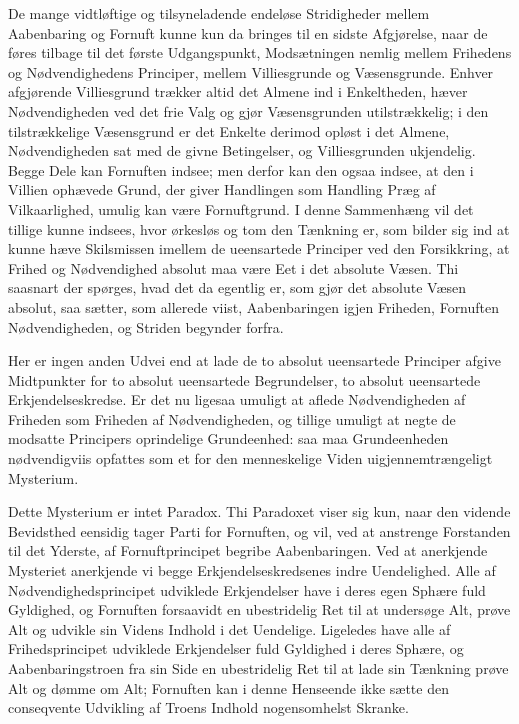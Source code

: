 \documentclass[12pt]{book}
\begin{document}
De mange vidtløftige og tilsyneladende endeløse Stridigheder mellem
Aabenbaring og Fornuft kunne kun da bringes til en sidste
Afgjørelse, naar de føres tilbage til det første Udgangspunkt,
Modsætningen nemlig mellem Frihedens og Nødvendighedens Principer,
mellem Villiesgrunde og Væsensgrunde. Enhver afgjørende Villiesgrund
trækker altid det Almene ind i Enkeltheden, hæver Nødvendigheden ved
det frie Valg og gjør Væsensgrunden utilstrækkelig; i den
tilstrækkelige Væsensgrund er det Enkelte derimod opløst i det
Almene, Nødvendigheden sat med de givne Betingelser, og
Villiesgrunden ukjendelig. Begge Dele kan Fornuften indsee; men
derfor kan den ogsaa indsee, at den i Villien ophævede Grund, der
giver Handlingen som Handling Præg af Vilkaarlighed, umulig kan være
Fornuftgrund. I denne Sammenhæng vil det tillige kunne indsees, hvor
ørkesløs og tom den Tænkning er, som bilder sig ind at kunne hæve
Skilsmissen imellem de ueensartede Principer ved den Forsikkring, at
Frihed og Nødvendighed absolut maa være Eet i det absolute Væsen.
Thi saasnart der spørges, hvad det da egentlig er, som gjør det
absolute Væsen absolut, saa
sætter, som allerede viist, Aabenbaringen igjen Friheden, Fornuften
Nødvendigheden, og Striden begynder forfra.

Her er ingen anden Udvei end at lade de to absolut ueensartede
Principer afgive Midtpunkter for to absolut ueensartede
Begrundelser, to absolut ueensartede Erkjendelseskredse. Er det nu
ligesaa umuligt at aflede Nødvendigheden af Friheden som Friheden af
Nødvendigheden, og tillige umuligt at negte de modsatte Principers
oprindelige Grundeenhed: saa maa Grundeenheden nødvendigviis
opfattes som et for den menneskelige Viden uigjennemtrængeligt
Mysterium.

Dette Mysterium er intet Paradox. Thi Paradoxet viser sig kun, naar
den vidende Bevidsthed eensidig tager Parti for Fornuften, og vil,
ved at anstrenge Forstanden til det Yderste, af Fornuftprincipet
begribe Aabenbaringen. Ved at anerkjende Mysteriet anerkjende vi
begge Erkjendelseskredsenes indre Uendelighed. Alle af
Nødvendighedsprincipet udviklede Erkjendelser have i deres egen
Sphære fuld Gyldighed, og Fornuften forsaavidt en ubestridelig Ret
til at undersøge Alt, prøve Alt og udvikle sin Videns Indhold i det
Uendelige. Ligeledes have alle af Frihedsprincipet udviklede
Erkjendelser fuld Gyldighed i deres Sphære, og Aabenbaringstroen fra
sin Side en ubestridelig Ret til at lade sin Tænkning prøve Alt og
dømme om Alt; Fornuften kan i denne Henseende ikke sætte den
conseqvente Udvikling af Troens Indhold nogensomhelst Skranke.
\end{document}
